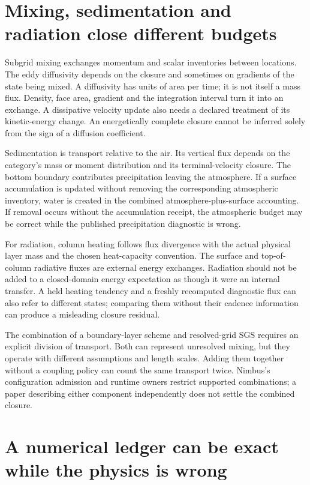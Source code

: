\section{Mixing, sedimentation and radiation close different budgets}

Subgrid mixing exchanges momentum and scalar inventories between locations.
The eddy diffusivity depends on the closure and sometimes on gradients of the
state being mixed. A diffusivity has units of area per time; it is not itself
a mass flux. Density, face area, gradient and the integration interval turn it
into an exchange. A dissipative velocity update also needs a declared treatment
of its kinetic-energy change. An energetically complete closure cannot be
inferred solely from the sign of a diffusion coefficient.

Sedimentation is transport relative to the air. Its vertical flux depends on
the category's mass or moment distribution and its terminal-velocity closure.
The bottom boundary contributes precipitation leaving the atmosphere. If a
surface accumulation is updated without removing the corresponding atmospheric
inventory, water is created in the combined atmosphere-plus-surface accounting.
If removal occurs without the accumulation receipt, the atmospheric budget may
be correct while the published precipitation diagnostic is wrong.

For radiation, column heating follows flux divergence with the actual physical
layer mass and the chosen heat-capacity convention. The surface and top-of-column
radiative fluxes are external energy exchanges. Radiation should not be added
to a closed-domain energy expectation as though it were an internal transfer.
A held heating tendency and a freshly recomputed diagnostic flux can also refer
to different states; comparing them without their cadence information can
produce a misleading closure residual.

The combination of a boundary-layer scheme and resolved-grid SGS requires an
explicit division of transport. Both can represent unresolved mixing, but they
operate with different assumptions and length scales. Adding them together
without a coupling policy can count the same transport twice. Nimbus's
configuration admission and runtime owners restrict supported combinations;
a paper describing either component independently does not settle the combined
closure.

\section{A numerical ledger can be exact while the physics is wrong}

